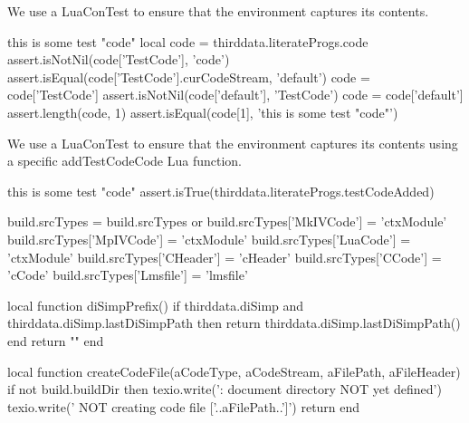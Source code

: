 \def\addMITLicense#1#2#3{
  \directlua{
    thirddata.literateProgs.addMITLicense('#1', '#2', '#3')
  }
}

\def\addApacheLicense#1#2#3{
  \directlua{
    thirddata.literateProgs.addApacheLicense('#1', '#2', '#3')
  }
}
\stopMkIVCode


We use a LuaConTest to ensure that the  environment 
captures its contents. 

\startConTest
\begingroup
  \startTestCode
    this is some test "code"
  \stopTestCode
  \startLuaConTest
    local code = thirddata.literateProgs.code
    assert.isNotNil(code['TestCode'], 'code')
    assert.isEqual(code['TestCode'].curCodeStream, 'default')
    code = code['TestCode']
    assert.isNotNil(code['default'], 'TestCode')
    code = code['default']
    assert.length(code, 1)
    assert.isEqual(code[1], 'this is some test "code"')
  \stopLuaConTest
\endgroup
\stopConTest
\stopTestCase


We use a LuaConTest to ensure that the  environment 
captures its contents using a specific addTestCodeCode Lua function. 

\startConTest
\begingroup
  \startTestCode
    this is some test "code"
  \stopTestCode
  \startLuaConTest
    assert.isTrue(thirddata.literateProgs.testCodeAdded)
  \stopLuaConTest
\endgroup
\stopConTest
\stopTestCase

\startLuaCode

build.srcTypes = build.srcTypes or { }
build.srcTypes['MkIVCode'] = 'ctxModule'
build.srcTypes['MpIVCode'] = 'ctxModule'
build.srcTypes['LuaCode']  = 'ctxModule'
build.srcTypes['CHeader']  = 'cHeader'
build.srcTypes['CCode']    = 'cCode'
build.srcTypes['Lmsfile']  = 'lmsfile'

local function diSimpPrefix()
  if thirddata.diSimp and thirddata.diSimp.lastDiSimpPath then
    return thirddata.diSimp.lastDiSimpPath()
  end
  return ""
end

local function createCodeFile(aCodeType,
                              aCodeStream,
                              aFilePath,
                              aFileHeader)
  if not build.buildDir then
    texio.write('\nERROR: document directory NOT yet defined\n')
    texio.write('       NOT creating code file ['..aFilePath..']\n\n')
    return
  end


